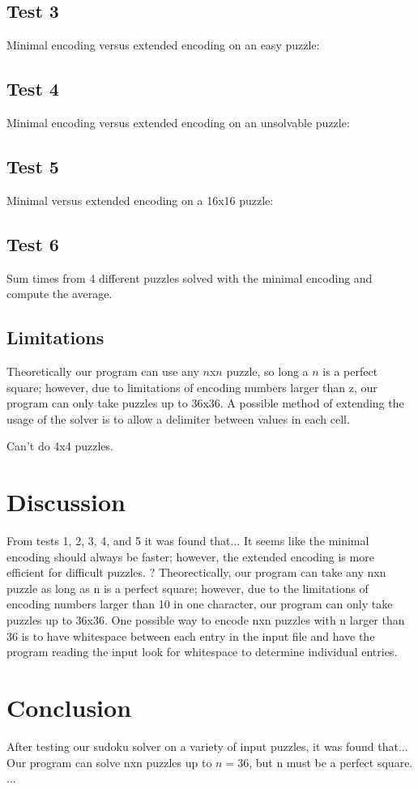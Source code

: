 \documentclass[conference,draftclsnofoot]{IEEEtran}
\begin{document}
\subsection{Test 3}
Minimal encoding versus extended encoding on an easy puzzle:

\subsection{Test 4}
Minimal encoding versus extended encoding on an unsolvable puzzle:

\subsection{Test 5}
Minimal versus extended encoding on a 16x16 puzzle:

\subsection{Test 6}
Sum times from 4 different puzzles solved with the minimal encoding and compute
the average.



\subsection{Limitations}
Theoretically our program can use any $n$x$n$ puzzle, so long a $n$ is a
perfect square; however, due to limitations of encoding numbers larger than z,
our program can only take puzzles up to 36x36. A possible method of extending
the usage of the solver is to allow a delimiter between values in each cell.


Can't do 4x4 puzzles.

\section{Discussion}
From tests 1, 2, 3, 4, and 5 it was found that...  It seems like the minimal
encoding should always be faster; however, the extended encoding is more
efficient for difficult puzzles. \(?\)
Theorectically, our program can take any nxn puzzle as long as n is a perfect
square; however, due to the limitations of encoding numbers larger than 10 in
one character, our program can only take puzzles up to 36x36. One possible way
to encode nxn puzzles with n larger than 36 is to have whitespace between each
entry in the input file and have the program reading the input look for
whitespace to determine individual entries.

\section{Conclusion}
After testing our sudoku solver on a variety of input puzzles, it was found
that...  Our program can solve nxn puzzles up to $n=36$, but n must be a
perfect square.  ...
\end{document}
